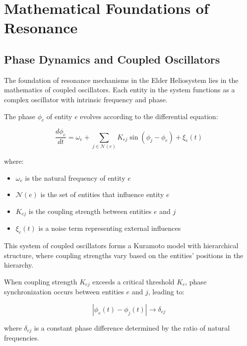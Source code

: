 \section{Mathematical Foundations of Resonance}

\subsection{Phase Dynamics and Coupled Oscillators}

The foundation of resonance mechanisms in the Elder Heliosystem lies in the mathematics of coupled oscillators. Each entity in the system functions as a complex oscillator with intrinsic frequency and phase.

\begin{definition}
The phase $\phi_e$ of entity $e$ evolves according to the differential equation:

\begin{equation}
\frac{d\phi_e}{dt} = \omega_e + \sum_{j \in \mathcal{N}(e)} K_{ej} \sin(\phi_j - \phi_e) + \xi_e(t)
\end{equation}

where:
\begin{itemize}
    \item $\omega_e$ is the natural frequency of entity $e$
    \item $\mathcal{N}(e)$ is the set of entities that influence entity $e$
    \item $K_{ej}$ is the coupling strength between entities $e$ and $j$
    \item $\xi_e(t)$ is a noise term representing external influences
\end{itemize}
\end{definition}

This system of coupled oscillators forms a Kuramoto model with hierarchical structure, where coupling strengths vary based on the entities' positions in the hierarchy.

\begin{theorem}
When coupling strength $K_{ej}$ exceeds a critical threshold $K_c$, phase synchronization occurs between entities $e$ and $j$, leading to:

\begin{equation}
|\phi_e(t) - \phi_j(t)| \to \delta_{ej}
\end{equation}

where $\delta_{ej}$ is a constant phase difference determined by the ratio of natural frequencies.
\end{theorem}


